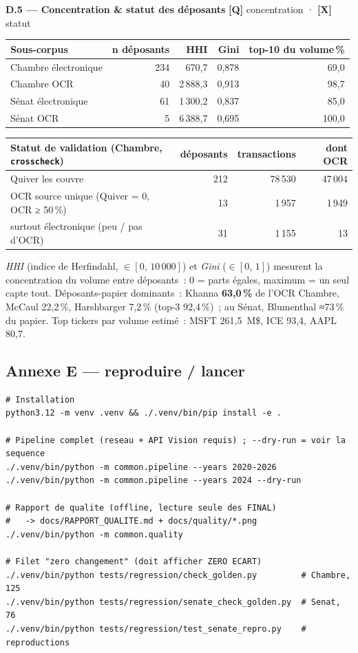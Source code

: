 \documentclass[11pt,a4paper]{article}
\newcommand{\co}[1]{\texttt{\small #1}}
\begin{document}
\textbf{D.5 — Concentration \& statut des déposants} \hfill {\footnotesize\textbf{[Q]} concentration · \textbf{[X]} statut}
\begin{center}\small
\begin{tabular}{l r rr r}
\toprule
\bfseries Sous-corpus & \bfseries n déposants & \bfseries HHI & \bfseries Gini & \bfseries top-10 du volume\,\%\\
\midrule
{\color{houseC}Chambre électronique} & 234 & 670,7 & 0,878 & 69,0 \\
{\color{houseC}Chambre OCR} & 40 & 2\,888,3 & 0,913 & 98,7 \\
{\color{senateC}Sénat électronique} & 61 & 1\,300,2 & 0,837 & 85,0 \\
{\color{senateC}Sénat OCR} & 5 & 6\,388,7 & 0,695 & 100,0 \\
\bottomrule
\end{tabular}
\end{center}
\begin{center}\small
\begin{tabular}{l rrr}
\toprule
\bfseries Statut de validation (Chambre, \co{crosscheck}) & déposants & transactions & dont OCR\\
\midrule
Quiver les couvre & 212 & 78\,530 & 47\,004 \\
OCR source unique (Quiver = 0, OCR ≥ 50\,\%) & 13 & 1\,957 & 1\,949 \\
surtout électronique (peu / pas d'OCR) & 31 & 1\,155 & 13 \\
\bottomrule
\end{tabular}
\end{center}
{\footnotesize \emph{HHI} (indice de Herfindahl, $\in [0,\,10\,000]$) et \emph{Gini} ($\in [0,\,1]$) mesurent
la concentration du volume entre déposants~: 0 = parts égales, maximum = un seul capte tout. Déposants-papier
dominants~: Khanna \textbf{63,0\,\%} de l'OCR Chambre, McCaul 22,2\,\%, Harshbarger 7,2\,\% (top-3 92,4\,\%)~;
au Sénat, Blumenthal ≈73\,\% du papier. Top tickers par volume estimé~: MSFT 261,5~M\$, ICE 93,4, AAPL 80,7.}


\subsection{Annexe E — reproduire / lancer}
\label{anx:run}
{\footnotesize
\begin{verbatim}
# Installation
python3.12 -m venv .venv && ./.venv/bin/pip install -e .

# Pipeline complet (reseau + API Vision requis) ; --dry-run = voir la sequence
./.venv/bin/python -m common.pipeline --years 2020-2026
./.venv/bin/python -m common.pipeline --years 2024 --dry-run

# Rapport de qualite (offline, lecture seule des FINAL)
#   -> docs/RAPPORT_QUALITE.md + docs/quality/*.png
./.venv/bin/python -m common.quality

# Filet "zero changement" (doit afficher ZERO ECART)
./.venv/bin/python tests/regression/check_golden.py         # Chambre, 125
./.venv/bin/python tests/regression/senate_check_golden.py  # Senat,    76
./.venv/bin/python tests/regression/test_senate_repro.py    # reproductions
\end{verbatim}}
\end{document}
